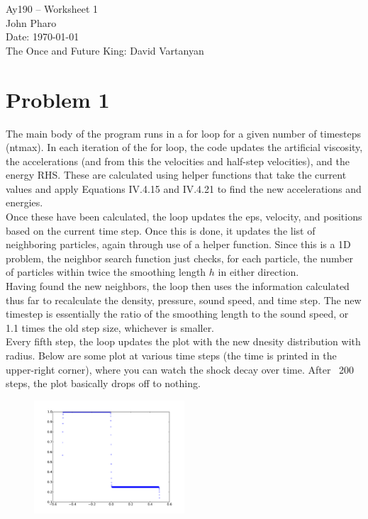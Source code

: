 \documentclass[11pt,letterpaper]{article}
\begin{document}
\begin{center}
\Large
Ay190 -- Worksheet 1\\
John Pharo\\
Date: \today\\
The Once and Future King: David Vartanyan
\end{center}

\section*{Problem 1}

The main body of the program runs in a for loop for a given number of timesteps (ntmax). In each iteration of the for loop, the code updates the artificial viscosity, the accelerations (and from this the velocities and half-step velocities), and the energy RHS. These are calculated using helper functions that take the current values and apply Equations IV.4.15 and IV.4.21 to find the new accelerations and energies. \\

Once these have been calculated, the loop updates the eps, velocity, and positions based on the current time step. Once this is done, it updates the list of neighboring particles, again through use of a helper function. Since this is a 1D problem, the neighbor search function just checks, for each particle, the number of particles within twice the smoothing length $h$ in either direction. \\

Having found the new neighbors, the loop then uses the information calculated thus far to recalculate the density, pressure, sound speed, and time step. The new timestep is essentially the ratio of the smoothing length to the sound speed, or 1.1 times the old step size, whichever is smaller. \\

Every fifth step, the loop updates the plot with the new dnesity distribution with radius. Below are some plot at various time steps (the time is printed in the upper-right corner), where you can watch the shock decay over time. After ~200 steps, the plot basically drops off to nothing.

\begin{figure}[bth]
\centering
\includegraphics[width=0.5\textwidth]{Shock-1.pdf}
\label{fig:simpleplot}
\end{figure}
\end{document}
